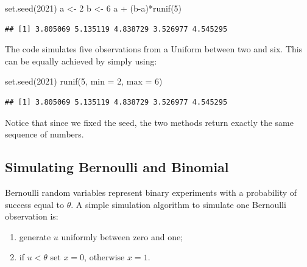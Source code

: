 \documentclass[
]{book}
\newenvironment{Shaded}{\begin{snugshade}}{\end{snugshade}}
\newcommand{\AttributeTok}[1]{\textcolor[rgb]{0.77,0.63,0.00}{#1}}
\newcommand{\DecValTok}[1]{\textcolor[rgb]{0.00,0.00,0.81}{#1}}
\newcommand{\FunctionTok}[1]{\textcolor[rgb]{0.00,0.00,0.00}{#1}}
\newcommand{\NormalTok}[1]{#1}
\newcommand{\OtherTok}[1]{\textcolor[rgb]{0.56,0.35,0.01}{#1}}
\newcommand{\SpecialCharTok}[1]{\textcolor[rgb]{0.00,0.00,0.00}{#1}}
\theoremstyle{definition}
\theoremstyle{definition}
\theoremstyle{definition}
\theoremstyle{definition}
\theoremstyle{remark}
\begin{document}
\begin{Shaded}
\begin{Highlighting}[]
\FunctionTok{set.seed}\NormalTok{(}\DecValTok{2021}\NormalTok{)}
\NormalTok{a }\OtherTok{\textless{}{-}} \DecValTok{2}
\NormalTok{b }\OtherTok{\textless{}{-}} \DecValTok{6}
\NormalTok{a }\SpecialCharTok{+}\NormalTok{ (b}\SpecialCharTok{{-}}\NormalTok{a)}\SpecialCharTok{*}\FunctionTok{runif}\NormalTok{(}\DecValTok{5}\NormalTok{)}
\end{Highlighting}
\end{Shaded}

\begin{verbatim}
## [1] 3.805069 5.135119 4.838729 3.526977 4.545295
\end{verbatim}

The code simulates five observations from a Uniform between two and six. This can be equally achieved by simply using:

\begin{Shaded}
\begin{Highlighting}[]
\FunctionTok{set.seed}\NormalTok{(}\DecValTok{2021}\NormalTok{)}
\FunctionTok{runif}\NormalTok{(}\DecValTok{5}\NormalTok{, }\AttributeTok{min =} \DecValTok{2}\NormalTok{, }\AttributeTok{max =} \DecValTok{6}\NormalTok{)}
\end{Highlighting}
\end{Shaded}

\begin{verbatim}
## [1] 3.805069 5.135119 4.838729 3.526977 4.545295
\end{verbatim}

Notice that since we fixed the seed, the two methods return exactly the same sequence of numbers.

\hypertarget{simulating-bernoulli-and-binomial}{%
\subsection{Simulating Bernoulli and Binomial}\label{simulating-bernoulli-and-binomial}}

Bernoulli random variables represent binary experiments with a probability of success equal to \(\theta\). A simple simulation algorithm to simulate one Bernoulli observation is:

\begin{enumerate}
\def\labelenumi{\arabic{enumi}.}
\item
  generate \(u\) uniformly between zero and one;
\item
  if \(u< \theta\) set \(x=0\), otherwise \(x=1\).
\end{enumerate}
\end{document}
